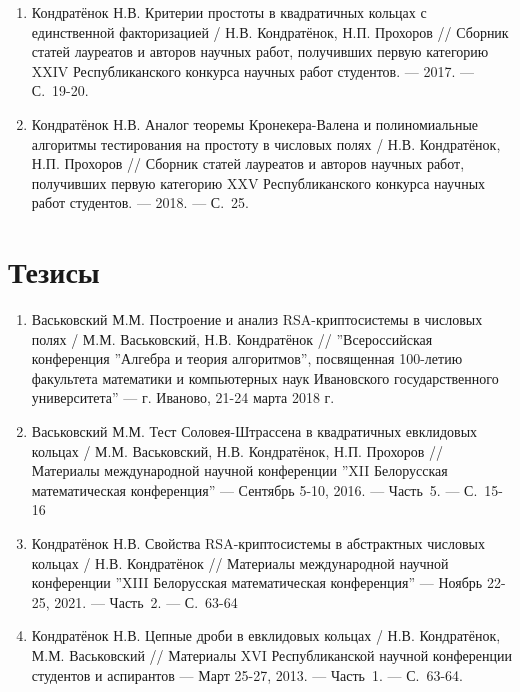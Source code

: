 \documentclass{article}
\begin{document}
\begin{enumerate}
    \item Кондратёнок Н.В. Критерии простоты в квадратичных кольцах с единственной факторизацией / Н.В. Кондратёнок, Н.П. Прохоров // Сборник статей лауреатов и авторов научных работ, получивших первую категорию XXIV Республиканского конкурса научных работ студентов. --- 2017. --- С.~19-20.
    
    \item Кондратёнок Н.В. Аналог теоремы Кронекера-Валена и полиномиальные алгоритмы тестирования на простоту в числовых полях / Н.В. Кондратёнок, Н.П. Прохоров // Сборник статей лауреатов и авторов научных работ, получивших первую категорию XXV Республиканского конкурса научных работ студентов. --- 2018. --- С.~25.
\end{enumerate}

\section{Тезисы}

\begin{enumerate}
    \item Васьковский М.М. Построение и анализ RSA-криптосистемы в числовых полях / М.М. Васьковский, Н.В. Кондратёнок // ''Всероссийская конференция ''Алгебра и теория алгоритмов'', посвященная 100-летию факультета математики и компьютерных наук Ивановского государственного университета'' --- г. Иваново, 21-24 марта 2018 г.

    \item Васьковский М.М. Тест Соловея-Штрассена в квадратичных евклидовых кольцах / М.М. Васьковский, Н.В. Кондратёнок, Н.П. Прохоров // Материалы международной научной конференции ''XII Белорусская математическая конференция'' --- Сентябрь 5-10, 2016. --- Часть~5. --- С.~15-16
    
    \item Кондратёнок Н.В. Свойства RSA-криптосистемы в абстрактных числовых кольцах / Н.В. Кондратёнок // Материалы международной научной конференции ''XIII Белорусская математическая конференция'' --- Ноябрь 22-25, 2021. --- Часть~2. --- С.~63-64


    \item Кондратёнок Н.В. Цепные дроби в евклидовых кольцах / Н.В. Кондратёнок, М.М. Васьковский // Материалы XVI Республиканской научной конференции студентов и аспирантов --- Март 25-27, 2013. --- Часть~1. --- С.~63-64.
\end{enumerate}
\end{document}
